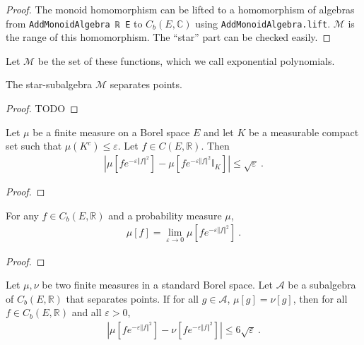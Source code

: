 \begin{proof} \leanok
The monoid homomorphism can be lifted to a homomorphism of algebras from \texttt{AddMonoidAlgebra ℝ E} to $C_b(E, \mathbb{C})$ using \texttt{AddMonoidAlgebra.lift}. $\mathcal M$ is the range of this homomorphism. The ``star'' part can be checked easily.
\end{proof}


Let $\mathcal M$ be the set of these functions, which we call exponential polynomials.

\begin{lemma}\label{lem:separates_points_expPoly}
 \leanok
{}
The star-subalgebra $\mathcal M$ separates points.
\end{lemma}

\begin{proof}
TODO
\end{proof}


\begin{lemma}\label{lem:integral_restrict_compact}
\mathlibok
{}
Let $\mu$ be a finite measure on a Borel space $E$ and let $K$ be a measurable compact set such that $\mu(K^c) \le \varepsilon$. Let $f \in C(E, \mathbb{R})$. Then
\begin{align*}
\left\vert \mu[fe^{-\varepsilon \Vert f \Vert^2}] - \mu[f e^{-\varepsilon \Vert f \Vert^2} \mathbb{I}_K] \right\vert
\le \sqrt{\varepsilon} \: .
\end{align*}
\end{lemma}

\begin{proof}\leanok
\end{proof}


\begin{lemma}\label{lem:introduce_exponential}
\mathlibok
{}
For any $f \in C_b(E, \mathbb{R})$ and a probability measure $\mu$,
\begin{align*}
\mu[f] 
= \lim_{\varepsilon \to 0} \mu\left[f e^{-\varepsilon \Vert f \Vert^2} \right]
\: .
\end{align*}
\end{lemma}

\begin{proof}\leanok
\end{proof}

\begin{lemma}\label{lem:dist_integral_mulExpNegMulSq_comp_le}
\mathlibok
{}
Let $\mu, \nu$ be two finite measures in a standard Borel space. Let $\mathcal{A}$ be a subalgebra of $C_b(E, \mathbb{R})$ that separates points.
If for all $g \in \mathcal A$, $\mu[g] = \nu[g]$, then for all $f \in C_b(E, \mathbb{R})$ and all $\varepsilon > 0$,
\begin{align*}
    \left\vert \mu[fe^{-\varepsilon \Vert f \Vert^2}] - \nu[f e^{-\varepsilon \Vert f \Vert^2}] \right\vert
    \le 6\sqrt{\varepsilon} \: .
\end{align*}
\end{lemma}


